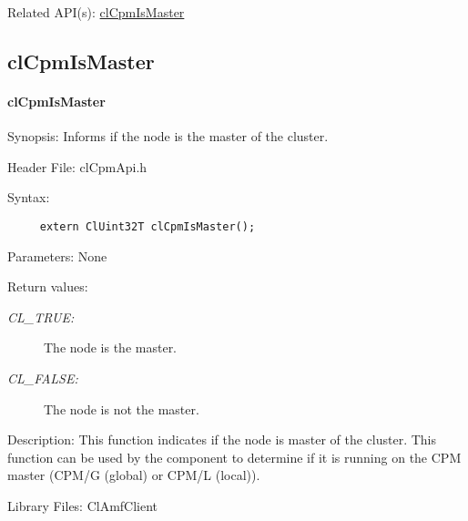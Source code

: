 {\begin{Desc}
\item[Related API(s):]\hyperlink{group__group14}{cl\-Cpm\-Is\-Master} \end{Desc}
\newpage






\subsection{clCpmIsMaster}
\hypertarget{pagecpm136}{}\paragraph{cl\-Cpm\-Is\-Master}\label{pagecpm136}
\begin{Desc}
\item[Synopsis:]Informs if the node is the master of the cluster.\end{Desc}
\begin{Desc}
\item[Header File:]clCpmApi.h\end{Desc}
\begin{Desc}
\item[Syntax:]

\footnotesize\begin{verbatim}     extern ClUint32T clCpmIsMaster();
\end{verbatim}
\normalsize
\end{Desc}
\begin{Desc}
\item[Parameters:]None\end{Desc}
\begin{Desc}
\item[Return values:]
\begin{description}
\item[{\em CL\_\-TRUE:}]The node is the master. \item[{\em CL\_\-FALSE:}]The node is not the master.\end{description}
\end{Desc}
\begin{Desc}
\item[Description:]This function indicates if the node is master of the cluster. This function can be used by the component to determine if it is running 
on the CPM master (CPM/G (global) or CPM/L (local)).\end{Desc}
\begin{Desc}
\item[Library Files:]Cl\-Amf\-Client\end{Desc}

}

